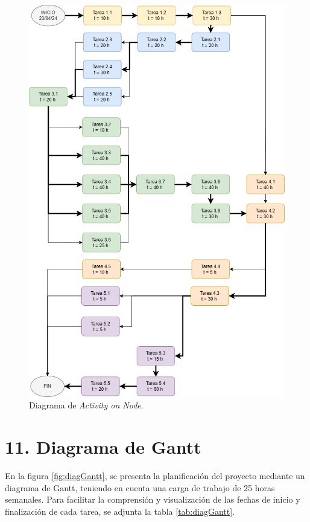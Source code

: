 \documentclass[
11pt, %
]{charter}
\begin{document}
\begin{figure}[htpb]
\centering 
\includegraphics[width=.75\textwidth]{./Figuras/AONdrawio.png}
\caption{Diagrama de \textit{Activity on Node}.}
\label{fig:AoN}
\end{figure}


\section{11. Diagrama de Gantt}
\label{sec:gantt}


En la figura \ref{fig:diagGantt}, se presenta la planificación del proyecto mediante un diagrama de Gantt, teniendo en cuenta una carga de trabajo de 25 horas semanales. Para facilitar la comprensión y visualización de las fechas de inicio y finalización de cada tarea, se adjunta la tabla \ref{tab:diagGantt}.
\end{document}
